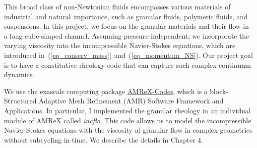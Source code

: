 \par
This broad class of non-Newtonian fluids encompasses various materials of industrial and natural importance,
such as granular fluids, polymeric fluids, and suspensions. 
In this project, we focus on the granular materials and their flow in a long cube-shaped channel. Assuming pressure-independent, we incorporate the varying viscosity into the incompressible Navier-Stokes equations, which are introduced in~(\ref{eq_conserv_mass}) and~(\ref{eq_momentum_NS}).
Our project goal is to have a constitutive rheology code that can capture such complex continuum dynamics. 
\par
We use the exascale computing package \href{https://amrex-codes.github.io/index.html}{{\color{blue}AMReX-Codes}}, which is a block-Structured Adaptive Mesh Refinement (AMR) Software Framework and Applications. In particular, I implemented the granular rheology in an individual module of AMReX called \href{https://amrex-codes.github.io/incflo/}{{\color{blue}\textit{incflo}}}. This code allows us to model the incompressible Navier-Stokes equations with the viscosity of granular flow in complex geometries without subcycling in time. We describe the details in Chapter 4.





